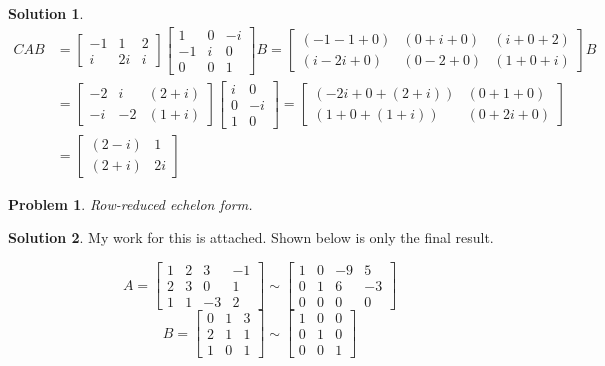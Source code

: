 \documentclass{article}
\newtheorem{problem}{Problem}
\theoremstyle{definition}
\newtheorem*{solution}{Solution}
\begin{document}
\begin{solution}
\begin{align*}
CAB&=
\begin{bmatrix}
-1 & 1 & 2 \\
i & 2i & i
\end{bmatrix}
\begin{bmatrix}
1 & 0 & -i \\
-1 & i & 0 \\
0 & 0 & 1
\end{bmatrix} B =
\begin{bmatrix}
(-1-1+0)&(0+i+0)&(i+0+2)\\
(i-2i+0)&(0-2+0)&(1+0+i)
\end{bmatrix} B \\
&=
\begin{bmatrix}
-2&i&(2+i)\\
-i&-2&(1+i)
\end{bmatrix}
\begin{bmatrix}
i & 0 \\
0 & -i \\
1 & 0
\end{bmatrix} =
\begin{bmatrix}
(-2i+0+(2+i))&(0+1+0)\\
(1+0+(1+i))&(0+2i+0)
\end{bmatrix} \\
&=
\boxed{
\begin{bmatrix}
(2-i)&1\\
(2+i)&2i
\end{bmatrix}}
\end{align*}

\end{solution}

\begin{problem}

Row-reduced echelon form.

\end{problem}

\begin{solution}

My work for this is attached.
Shown below is only the final result.

\[
A=
\begin{bmatrix}
1&2&3&-1\\
2&3&0&1\\
1&1&-3&2
\end{bmatrix}\sim
\begin{bmatrix}
1&0&-9&5\\
0&1&6&-3\\
0&0&0&0
\end{bmatrix}
\]
\[
B=
\begin{bmatrix}
0&1&3\\
2&1&1\\
1&0&1
\end{bmatrix}\sim
\begin{bmatrix}
1&0&0\\
0&1&0\\
0&0&1
\end{bmatrix}
\]

\end{solution}
\end{document}
